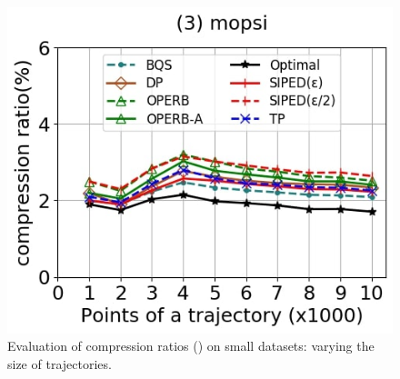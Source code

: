 \begin{figure}[tb!]
	\includegraphics[scale=0.250]{Figures/Exp-PED-CR-size-mopsi.jpg}		
	\vspace{-2ex}
	\caption{\small Evaluation of compression ratios (\ped) on small datasets: varying the size of
		trajectories.}
	\label{fig:cr-ped-size}
	\vspace{-2ex}
\end{figure}
